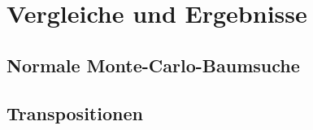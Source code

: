 \section{Vergleiche und Ergebnisse}
\label{chap:results}

\subsection{Normale Monte-Carlo-Baumsuche}
\label{chap:results-mcts}

\subsection{Transpositionen}